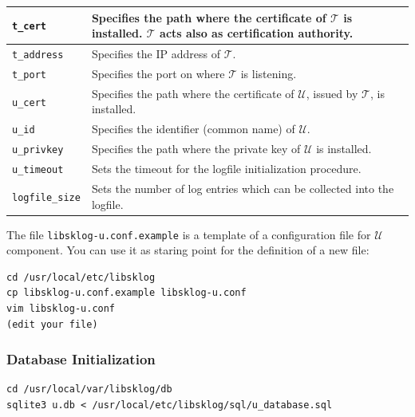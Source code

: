 \documentclass[a4paper,12pt]{article}
\def\u{$\mathcal{U}$\xspace}
\def\t{$\mathcal{T}$\xspace}
\begin{document}
\begin{center}
\small{
\begin{tabular}{|p{}|p{}|}
\hline
\texttt{t\_cert} & Specifies the path where the certificate of \t is installed.
                   \t acts also as certification authority.\\ \hline
\texttt{t\_address} & Specifies the IP address of \t. \\ \hline
\texttt{t\_port} & Specifies the port on where \t is listening.\\ \hline
\texttt{u\_cert} & Specifies the path where the certificate of \u,
                   issued by \t, is installed. \\ \hline
\texttt{u\_id} & Specifies the identifier (common name) of \u.\\ \hline
\texttt{u\_privkey} & Specifies the path where the private key of \u is
                      installed. \\ \hline
\texttt{u\_timeout} & Sets the timeout for the logfile initialization
                      procedure.\\ \hline
\texttt{logfile\_size} & Sets the number of log entries which can be
                         collected into the logfile.\\ \hline
\end{tabular}
}
\end{center}

The file \texttt{libsklog-u.conf.example} is a template of a
configuration file for \u component. You can use it as staring point
for the definition of a new file:\ \\

\begin{lstlisting}
cd /usr/local/etc/libsklog
cp libsklog-u.conf.example libsklog-u.conf
vim libsklog-u.conf
(edit your file)
\end{lstlisting}

\subsubsection{Database Initialization}

\begin{lstlisting}
cd /usr/local/var/libsklog/db
sqlite3 u.db < /usr/local/etc/libsklog/sql/u_database.sql
\end{lstlisting}

\end{document}
